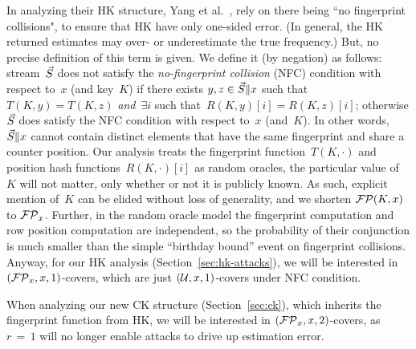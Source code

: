 In analyzing their HK structure, Yang et al.~\cite{yang2019heavykeeper}, rely on there being ``no fingerprint collisions", to ensure that HK have only one-sided error. (In general, the HK returned estimates may over- or underestimate the true frequency.)  But, no precise definition of this term is given.  We define it (by negation) as follows: stream~$\vec{S}$ does not satisfy the \emph{no-fingerprint collision} (NFC) condition with respect to~$x$ (and key~$K$) if there exists $y,z \in \vec{S}\|x$ such that~$T(K,y)=T(K,z)$ \emph{and}~$\exists i$ such that~$R(K,y)[i] = R(K,z)[i]$; otherwise $\vec{S}$ does satisfy the NFC condition with respect to~$x$ (and~$K$). In other words,~$\vec{S}\|x$ cannot contain distinct elements that have the same fingerprint and share a counter position.  Our analysis treats the fingerprint function~$T(K,\cdot)$ and position hash functions~$R(K,\cdot)[i]$ as random oracles, the particular value of~$K$ will not matter, only whether or not it is publicly known.  As such, explicit mention of~$K$ can be elided without loss of generality, and we shorten $\mathcal{FP}(K,x)$ to $\mathcal{FP}_x$.  Further, in the random oracle model the fingerprint computation and row position computation are independent, so the probability of their conjunction is much smaller than the simple ``birthday bound'' event on fingerprint collisions. Anyway, for our HK analysis (Section~\ref{sec:hk-attacks}), we will be interested in $(\mathcal{FP}_x,x,1)$-covers, which are just $(\mathcal{U},x,1)$-covers under NFC condition. 


When analyzing our new CK structure (Section~\ref{sec:ck}), which inherits the fingerprint function from HK, we will be interested in $(\mathcal{FP}_x,x,2)$-covers, as $r\,{=}\,1$ will no longer enable attacks to drive up estimation error.

